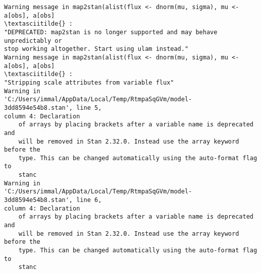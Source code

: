 \documentclass[11pt]{article}
\begin{document}
    \begin{Verbatim}[commandchars=\\\{\}]
Warning message in map2stan(alist(flux <- dnorm(mu, sigma), mu <- a[obs], a[obs]
\textasciitilde{} :
"DEPRECATED: map2stan is no longer supported and may behave unpredictably or
stop working altogether. Start using ulam instead."
Warning message in map2stan(alist(flux <- dnorm(mu, sigma), mu <- a[obs], a[obs]
\textasciitilde{} :
"Stripping scale attributes from variable flux"
Warning in
'C:/Users/immal/AppData/Local/Temp/RtmpaSqGVm/model-3dd8594e54b8.stan', line 5,
column 4: Declaration
    of arrays by placing brackets after a variable name is deprecated and
    will be removed in Stan 2.32.0. Instead use the array keyword before the
    type. This can be changed automatically using the auto-format flag to
    stanc
Warning in
'C:/Users/immal/AppData/Local/Temp/RtmpaSqGVm/model-3dd8594e54b8.stan', line 6,
column 4: Declaration
    of arrays by placing brackets after a variable name is deprecated and
    will be removed in Stan 2.32.0. Instead use the array keyword before the
    type. This can be changed automatically using the auto-format flag to
    stanc


    \end{Verbatim}
\end{document}

